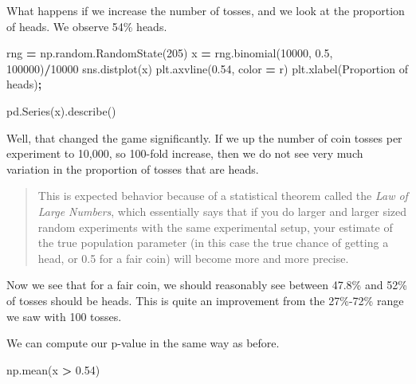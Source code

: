 \documentclass[
  letterpaper,
]{scrbook}
\newenvironment{Shaded}{\begin{snugshade}}{\end{snugshade}}
\newcommand{\DecValTok}[1]{\textcolor[rgb]{0.00,0.00,0.81}{#1}}
\newcommand{\FloatTok}[1]{\textcolor[rgb]{0.00,0.00,0.81}{#1}}
\newcommand{\NormalTok}[1]{#1}
\newcommand{\OperatorTok}[1]{\textcolor[rgb]{0.81,0.36,0.00}{\textbf{#1}}}
\newcommand{\StringTok}[1]{\textcolor[rgb]{0.31,0.60,0.02}{#1}}
\begin{document}
What happens if we increase the number of tosses, and we look at the proportion of heads. We observe 54\% heads.

\begin{Shaded}
\begin{Highlighting}[]
\NormalTok{rng }\OperatorTok{=}\NormalTok{ np.random.RandomState(}\DecValTok{205}\NormalTok{)}
\NormalTok{x }\OperatorTok{=}\NormalTok{ rng.binomial(}\DecValTok{10000}\NormalTok{, }\FloatTok{0.5}\NormalTok{, }\DecValTok{100000}\NormalTok{)}\OperatorTok{/}\DecValTok{10000}
\NormalTok{sns.distplot(x)}
\NormalTok{plt.axvline(}\FloatTok{0.54}\NormalTok{, color }\OperatorTok{=} \StringTok{\textquotesingle{}r\textquotesingle{}}\NormalTok{)}
\NormalTok{plt.xlabel(}\StringTok{\textquotesingle{}Proportion of heads\textquotesingle{}}\NormalTok{)}\OperatorTok{;}
\end{Highlighting}
\end{Shaded}

\begin{Shaded}
\begin{Highlighting}[]
\NormalTok{pd.Series(x).describe()}
\end{Highlighting}
\end{Shaded}

Well, that changed the game significantly. If we up the number of coin tosses per experiment to 10,000, so 100-fold increase, then we do not see very much variation in the proportion of tosses that are heads.

\begin{quote}
This is expected behavior because of a statistical theorem called the \emph{Law of Large Numbers}, which essentially says that if you do larger and larger sized random experiments with the same experimental setup, your estimate of the true population parameter (in this case the true chance of getting a head, or 0.5 for a fair coin) will become more and more precise.
\end{quote}

Now we see that for a fair coin, we should reasonably see between 47.8\% and 52\% of tosses should be heads. This is quite an improvement from the 27\%-72\% range we saw with 100 tosses.

We can compute our p-value in the same way as before.

\begin{Shaded}
\begin{Highlighting}[]
\NormalTok{np.mean(x }\OperatorTok{\textgreater{}} \FloatTok{0.54}\NormalTok{)}
\end{Highlighting}
\end{Shaded}
\end{document}
